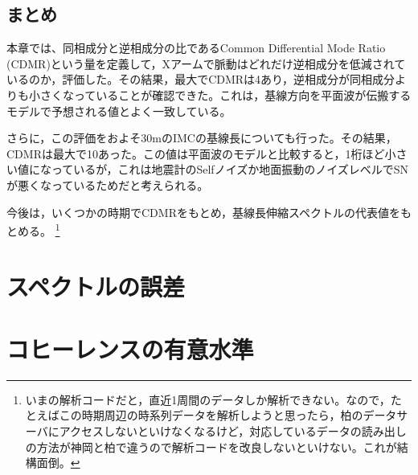 \subsection{まとめ}
本章では、同相成分と逆相成分の比であるCommon Differential Mode Ratio (CDMR)という量を定義して，Xアームで脈動はどれだけ逆相成分を低減されているのか，評価した。その結果，最大でCDMRは4あり，逆相成分が同相成分よりも小さくなっていることが確認できた。これは，基線方向を平面波が伝搬するモデルで予想される値とよく一致している。

さらに，この評価をおよそ30mのIMCの基線長についても行った。その結果，CDMRは最大で10あった。この値は平面波のモデルと比較すると，1桁ほど小さい値になっているが，これは地震計のSelfノイズか地面振動のノイズレベルでSNが悪くなっているためだと考えられる。

今後は，いくつかの時期でCDMRをもとめ，基線長伸縮スペクトルの代表値をもとめる。 \footnote[13]{いまの解析コードだと，直近1周間のデータしか解析できない。なので，たとえばこの時期周辺の時系列データを解析しようと思ったら，柏のデータサーバにアクセスしないといけなくなるけど，対応しているデータの読み出しの方法が神岡と柏で違うので解析コードを改良しないといけない。これが結構面倒。}


\appendix
\section{スペクトルの誤差}
\section{コヒーレンスの有意水準}



